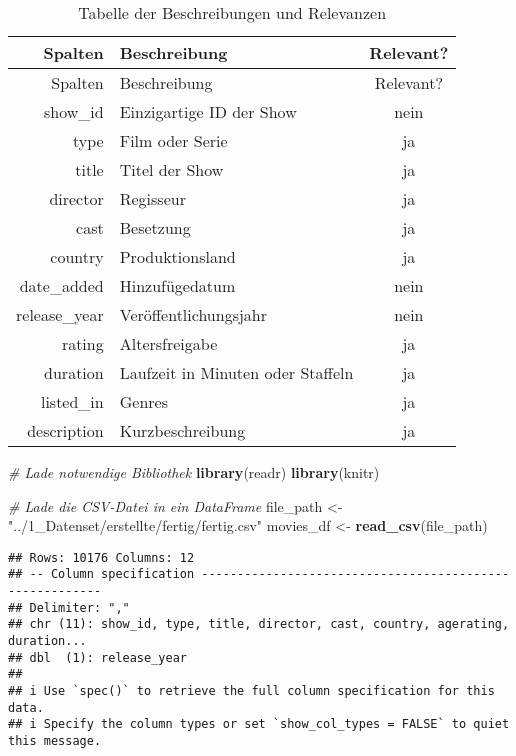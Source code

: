 \documentclass[
]{article}
\newenvironment{Shaded}{\begin{snugshade}}{\end{snugshade}}
\newcommand{\CommentTok}[1]{\textcolor[rgb]{0.56,0.35,0.01}{\textit{#1}}}
\newcommand{\FunctionTok}[1]{\textcolor[rgb]{0.13,0.29,0.53}{\textbf{#1}}}
\newcommand{\NormalTok}[1]{#1}
\newcommand{\OtherTok}[1]{\textcolor[rgb]{0.56,0.35,0.01}{#1}}
\newcommand{\StringTok}[1]{\textcolor[rgb]{0.31,0.60,0.02}{#1}}
\begin{document}
\begin{longtable}[]{@{}rlc@{}}
\caption{Tabelle der Beschreibungen und Relevanzen}\tabularnewline
\toprule\noalign{}
Spalten & Beschreibung & Relevant? \\
\midrule\noalign{}
\endfirsthead
\toprule\noalign{}
Spalten & Beschreibung & Relevant? \\
\midrule\noalign{}
\endhead
\bottomrule\noalign{}
\endlastfoot
show\_id & Einzigartige ID der Show & nein \\
type & Film oder Serie & ja \\
title & Titel der Show & ja \\
director & Regisseur & ja \\
cast & Besetzung & ja \\
country & Produktionsland & ja \\
date\_added & Hinzufügedatum & nein \\
release\_year & Veröffentlichungsjahr & nein \\
rating & Altersfreigabe & ja \\
duration & Laufzeit in Minuten oder Staffeln & ja \\
listed\_in & Genres & ja \\
description & Kurzbeschreibung & ja \\
\end{longtable}

\begin{Shaded}
\begin{Highlighting}[]
\CommentTok{\# Lade notwendige Bibliothek}
\FunctionTok{library}\NormalTok{(readr)}
\FunctionTok{library}\NormalTok{(knitr)}

\CommentTok{\# Lade die CSV{-}Datei in ein DataFrame}
\NormalTok{file\_path }\OtherTok{\textless{}{-}} \StringTok{"../1\_Datenset/erstellte/fertig/fertig.csv"}
\NormalTok{movies\_df }\OtherTok{\textless{}{-}} \FunctionTok{read\_csv}\NormalTok{(file\_path)}
\end{Highlighting}
\end{Shaded}

\begin{verbatim}
## Rows: 10176 Columns: 12
## -- Column specification --------------------------------------------------------
## Delimiter: ","
## chr (11): show_id, type, title, director, cast, country, agerating, duration...
## dbl  (1): release_year
## 
## i Use `spec()` to retrieve the full column specification for this data.
## i Specify the column types or set `show_col_types = FALSE` to quiet this message.
\end{verbatim}
\end{document}
